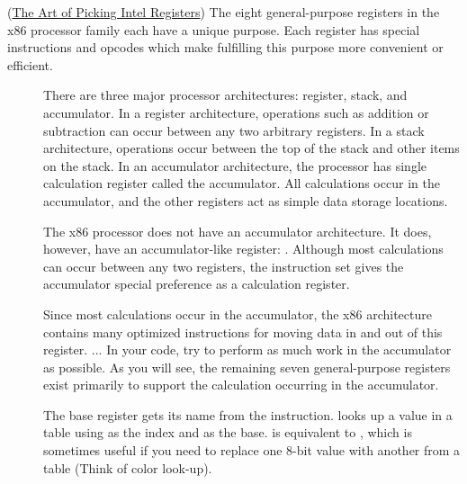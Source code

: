 (\href{http://www.swansontec.com/sregisters.html}{The Art of Picking Intel Registers}) The
eight general-purpose registers in the x86 processor family each have a unique
purpose. Each register has special instructions and opcodes which make fulfilling this
purpose more convenient or efficient.
\begin{description}
\item[] There are three major processor architectures: register, stack, and
  accumulator. In a register architecture, operations such as addition or subtraction can
  occur between any two arbitrary registers. In a stack architecture, operations occur
  between the top of the stack and other items on the stack. In an accumulator
  architecture, the processor has single calculation register called the accumulator. All
  calculations occur in the accumulator, and the other registers act as simple data
  storage locations.

  The x86 processor does not have an accumulator architecture. It does, however, have an
  accumulator-like register: . Although most calculations can occur between
  any two registers, the instruction set gives the accumulator special preference as a
  calculation register.

  Since most calculations occur in the accumulator, the x86 architecture contains many
  optimized instructions for moving data in and out of this register. ... In your code,
  try to perform as much work in the accumulator as possible. As you will see, the
  remaining seven general-purpose registers exist primarily to support the calculation
  occurring in the accumulator.
\item[] The base register gets its name from the 
  instruction.  looks up a value in a table using  as the index and
   as the base.  is equivalent to , which is
  sometimes useful if you need to replace one 8-bit value with another from a table (Think
  of color look-up).


\end{description}
